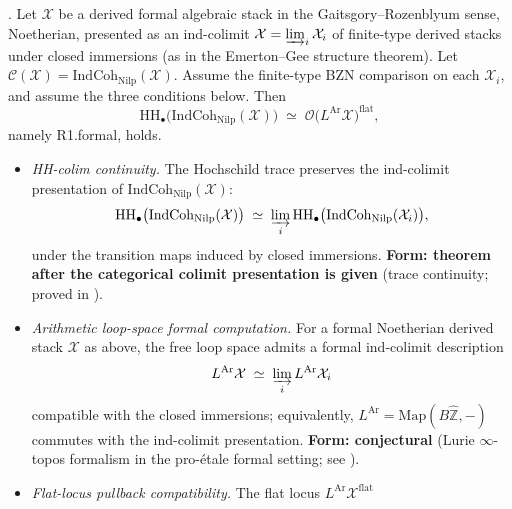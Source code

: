 \begin{theorem}
\label{v4-arith:bzn-sub:thm:R1-formal-reduction}
\ClaimStatusProvedHere. Let \(\mathcal{X}\) be a derived formal
algebraic stack in the Gaitsgory--Rozenblyum sense, Noetherian,
presented as an ind-colimit \(\mathcal{X}=\varinjlim_{i}\mathcal{X}_{i}\)
of finite-type derived stacks under closed immersions (as in the
Emerton--Gee structure theorem). Let
\(\mathcal{C}(\mathcal{X})=\mathrm{IndCoh}_{\mathrm{Nilp}}(\mathcal{X})\).
Assume the finite-type BZN comparison on each \(\mathcal{X}_{i}\), and
assume the three conditions below. Then
\begin{equation}
\label{v4-arith:bzn-sub:eq:R1-formal}
\mathrm{HH}_{\bullet}\bigl(\mathrm{IndCoh}_{\mathrm{Nilp}}(\mathcal{X})\bigr)\;\simeq\;\mathcal{O}\bigl(L^{\mathrm{Ar}}\mathcal{X}\bigr)^{\mathrm{flat}},
\end{equation}
namely R1.formal, holds.
\begin{itemize}
\item[\textbf{(R1.formal.a)}] \emph{HH-colim continuity.} The
Hochschild trace preserves the ind-colimit presentation of
\(\mathrm{IndCoh}_{\mathrm{Nilp}}(\mathcal{X})\):
\begin{equation}
\mathrm{HH}_{\bullet}\bigl(\mathrm{IndCoh}_{\mathrm{Nilp}}(\mathcal{X})\bigr)\;\simeq\;\varinjlim_{i}\mathrm{HH}_{\bullet}\bigl(\mathrm{IndCoh}_{\mathrm{Nilp}}(\mathcal{X}_{i})\bigr),
\end{equation}
under the transition maps induced by closed immersions.
\textbf{Form: theorem after the categorical colimit presentation is
given} (trace continuity; proved in
).
\item[\textbf{(R1.formal.b)}] \emph{Arithmetic loop-space formal
computation.} For a formal Noetherian derived stack \(\mathcal{X}\)
as above, the free loop space admits a formal ind-colimit
description
\begin{equation}
L^{\mathrm{Ar}}\mathcal{X}\;\simeq\;\varinjlim_{i}L^{\mathrm{Ar}}\mathcal{X}_{i}
\end{equation}
compatible with the closed immersions; equivalently,
\(L^{\mathrm{Ar}}=\mathrm{Map}(B\widehat{\mathbb{Z}},-)\) commutes
with the ind-colimit presentation.
\textbf{Form: conjectural} (Lurie \(\infty\)-topos formalism in the
pro-\'etale formal setting; see
).
\item[\textbf{(R1.formal.c)}] \emph{Flat-locus pullback
compatibility.} The flat locus \(L^{\mathrm{Ar}}\mathcal{X}^{\mathrm{flat}}\)

\end{itemize}
\end{theorem}
